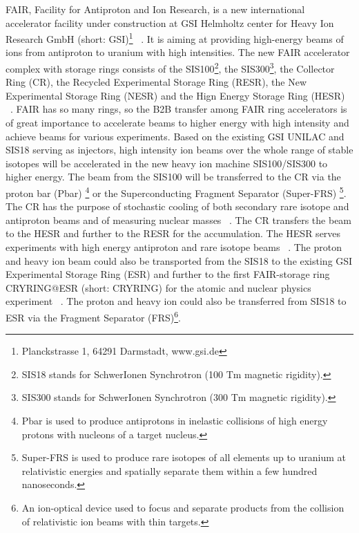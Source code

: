 \gls{FAIR}, Facility for Antiproton and Ion Research, is a new international accelerator facility under construction at \gls{GSI} Helmholtz center for Heavy Ion Research GmbH (short: GSI)\footnote{Planckstrasse 1, 64291 Darmstadt, www.gsi.de} ~\cite{eschke_international_2005, _fair_2011}. It is aiming at providing high-energy beams of ions from antiproton to uranium with high intensities. The new FAIR accelerator complex with storage rings consists of the \gls{SIS100}\footnote{SIS18 stands for SchwerIonen Synchrotron (100 Tm magnetic rigidity).}, the SIS300\footnote{SIS300 stands for SchwerIonen Synchrotron (300 Tm magnetic rigidity).}, the Collector Ring (\gls{CR}), the Recycled Experimental Storage Ring (\gls{RESR}), the New Experimental Storage Ring (\gls{NESR}) and the Hign Energy Storage Ring (\gls{HESR}) ~\cite{spiller_fair_2006, steck_advanced_2008}. FAIR has so many rings, so the B2B transfer among FAIR ring accelerators is of great importance to accelerate beams to higher energy with high intensity and achieve beams for various experiments. Based on the existing GSI \gls{UNILAC} and \gls{SIS18} serving as injectors, high intensity ion beams over the whole range of stable isotopes will be accelerated in the new heavy ion machine SIS100/\gls{SIS300} to higher energy. The beam from the SIS100 will be transferred to the CR via the proton bar (\gls{Pbar}) \footnote{Pbar is used to produce antiprotons in inelastic collisions of high energy protons with nucleons of a target nucleus.} or the Superconducting Fragment Separator (Super-FRS) \footnote{Super-FRS is used to produce rare isotopes of all elements up to uranium at relativistic energies and spatially separate them within a few hundred nanoseconds.}. The CR has the purpose of stochastic cooling of both secondary rare isotope and antiproton beams and of measuring nuclear masses ~\cite{nolden_collector_2006, abe_technical_2010}. The CR transfers the beam to the HESR and further to the RESR for the accumulation. The HESR serves experiments with high energy antiproton and rare isotope beams ~\cite{toelle_hesr_2007}. The proton and heavy ion beam could also be transported from the SIS18 to the existing GSI Experimental Storage Ring (\gls{ESR}) and further to the first FAIR-storage ring CRYRING@ESR (short: CRYRING) for the atomic and nuclear physics experiment ~\cite{lestinsky_cryring_2015, lestinsky_cryring_2012}. The proton and heavy ion could also be transferred from SIS18 to ESR via the Fragment Separator (\gls{FRS})\footnote{An ion-optical device used to focus and separate products from the collision of relativistic ion beams with thin targets.}.

